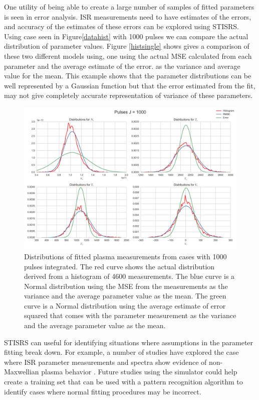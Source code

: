 \documentclass[draft,ras]{agutex}
\begin{document}
\begin{article}
One utility of being able to create a large number of samples of fitted parameters is seen in error analysis. ISR measurements need to have estimates of the errors, and accuracy of the estimates of these errors can be explored using STISRS. Using case seen in Figure\ref{datahist} with 1000 pulses we can compare the actual distribution of parameter values. Figure \ref{histsingle} shows gives a comparison of these two different models using, one using the actual MSE calculated from each parameter and the average estimate of the error. 
as the variance and average value for the mean. This example shows that the parameter distributions can be well represented by a Gaussian function but that the error estimated from the fit, may not give completely accurate representation of variance of these parameters. 

\begin{figure}[!t]
\centering
\includegraphics[width=5in]{histsingle}
\caption{Distributions of fitted plasma measurements from cases with 1000 pulses integrated. The red curve shows the actual distribution derived from a histogram of 4600 measurements. The blue curve is a Normal distribution using the MSE from the measurements as the variance and the average parameter value as the mean.  The green curve is a Normal distribution using the average estimate of error squared that comes with the parameter measurement as the variance and the average parameter value as the mean.}
\label{fig:statshistsingle}
\end{figure}


STISRS can useful for identifying situations where assumptions in the parameter fitting break down. For example, a number of studies have explored the case where ISR parameter measurements and spectra show evidence of non-Maxwellian plasma behavior \citet{Akbari:2012dz,Akbari:2015fv}. Future studies using the simulator could help create a training set that can be used with a pattern recognition algorithm to identify cases where normal fitting procedures may be incorrect.


\end{article}
\end{document}
